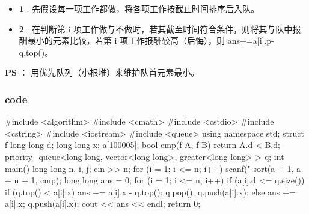 \begin{itemize}
\item \textbf{1} . 先假设每一项工作都做，将各项工作按截止时间排序后入队。      
\item \textbf{2} . 在判断第 i 项工作做与不做时，若其截至时间符合条件，则将其与队中报酬最小的元素比较，若第 i 项工作报酬较高（后悔），则 ans+=a[i].p-q.top()。      
\end{itemize}

\textbf{PS} ： 用优先队列（小根堆）来维护队首元素最小。          

\subsubsection{code}

\begin{cppcode}
#include <algorithm>
#include <cmath>
#include <cstdio>
#include <cstring>
#include <iostream>
#include <queue>
using namespace std;
struct f {
  long long d;
  long long x;
} a[100005];
bool cmp(f A, f B) { return A.d < B.d; }
priority_queue<long long, vector<long long>, greater<long long> > q;
int main() {
  long long n, i, j;
  cin >> n;
  for (i = 1; i <= n; i++) {
    scanf("%
  }
  sort(a + 1, a + n + 1, cmp);
  long long ans = 0;
  for (i = 1; i <= n; i++) {
    if (a[i].d <= q.size()) {
      if (q.top() < a[i].x) {
        ans += a[i].x - q.top();
        q.pop();
        q.push(a[i].x);
      }
    } else {
      ans += a[i].x;
      q.push(a[i].x);
    }
  }
  cout << ans << endl;
  return 0;
}
\end{cppcode}
